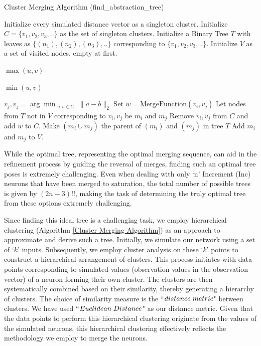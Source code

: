 \begin{algorithm}[H]
\caption{Cluster Merging Algorithm (find\_abstraction\_tree)}
\label{Cluster Merging Algorithm}
\begin{algorithmic}[1]
    \State Initialize every simulated distance vector as a singleton cluster.
    \State Initialize $C=\{v_1,v_2,v_3,..\}$ as the set of singleton clusters.
    \State Initialize a Binary Tree $T$ with leaves as $\{(n_1),(n_2),(n_3),..\}$ corresponding to $\{v_1,v_2,v_3,..\}$.
    \State Initialize $V$ as a set of visited nodes, empty at first.
    
        {
        
            \Return $\max(u, v)$
        }
        \Else{ }
        {
        
            \Return $\min(u, v)$
        }
        \EndIf
    \EndFunction
    
        \State $v_j, v_j = \arg\min_{\substack{a, b \in C}} \| a - b \|_2$
        \State Set $w=\text{MergeFunction}(v_i,v_j)$
        \State Let nodes from $T$ not in $V$ corresponding to $v_i,v_j$ be $m_i$ and $m_j$
        \State Remove $v_i,v_j$ from $C$ and add $w$ to $C$.
        \State Make $(m_i \cup m_j)$ the parent of $(m_i)$ and $(m_j)$ in tree $T$
        \State Add $m_i$ and $m_j$ to $V$.
    \EndWhile
\end{algorithmic}
\end{algorithm}

While the optimal tree, representing the optimal merging sequence, can aid in the refinement process by guiding the reversal of merges, finding such an optimal tree poses is extremely challenging. Even when dealing with only `n' Increment (Inc) neurons that have been merged to saturation, the total number of possible trees is given by $(2n-3)!!$, making the task of determining the truly optimal tree from these options extremely challenging.

Since finding this ideal tree is a challenging task, we employ hierarchical clustering (Algorithm \ref{Cluster Merging Algorithm}) as an approach to approximate and derive such a tree. Initially, we simulate our network using a set of `$k$' inputs. Subsequently, we employ cluster analysis on these `$k$' points to construct a hierarchical arrangement of clusters. This process initiates with data points corresponding to simulated values (observation values in the observation vector) of a neuron  forming their own cluster. The clusters are then systematically combined based on their similarity, thereby generating a hierarchy of clusters. The choice of similarity measure is the ``$distance \hspace{1mm} metric$" between clusters. We have used ``$Euclidean \hspace{1mm} Distance$" as our distance metric. Given that the data points to perform this hierarchical clustering originate from the values of the simulated neurons, this hierarchical clustering effectively reflects the methodology we employ to merge the neurons.

